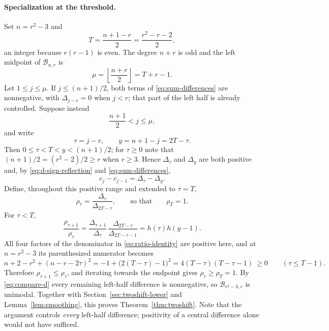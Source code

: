 \documentclass[11pt]{article}
\theoremstyle{research}
\theoremstyle{definition}
\newcommand{\TS}{\mathcal B}
\numberwithin{equation}{section}
\begin{document}
\paragraph{Specialization at the threshold.}
Set $n=r^2-3$ and
\begin{equation}\label{eq:T}
 T=\frac{n+1-r}{2}=\frac{r^2-r-2}{2},
\end{equation}
an integer because $r(r-1)$ is even. The degree $n+r$ is odd and the left
midpoint of $\TS_{n,r}$ is
\begin{equation}\label{eq:mu}
 \mu=\left\lfloor\frac{n+r}{2}\right\rfloor=T+r-1 .
\end{equation}
Let $1\le j\le\mu$. If $j\le(n+1)/2$, both terms of
\eqref{eq:sum-differences} are nonnegative, with $\Delta_{j-r}=0$ when
$j<r$; that part of the left half is already controlled. Suppose instead
\begin{equation}\label{eq:hard-range}
 \frac{n+1}{2}<j\le\mu,
\end{equation}
and write
\[
 \tau=j-r,\qquad y=n+1-j=2T-\tau .
\]
Then $0\le\tau<T<y<(n+1)/2$; for $\tau\ge0$ note that
$(n+1)/2=(r^2-2)/2\ge r$ when $r\ge3$.
Hence $\Delta_\tau$ and $\Delta_y$ are both positive and, by
\eqref{eq:d-sign-reflection} and \eqref{eq:sum-differences},
\begin{equation}\label{eq:compare-d}
 c_j-c_{j-1}=\Delta_\tau-\Delta_y .
\end{equation}
Define, throughout this positive range and extended to $\tau=T$,
\[
 \rho_\tau=\frac{\Delta_\tau}{\Delta_{2T-\tau}},
 \qquad\text{so that}\qquad \rho_T=1 .
\]
For $\tau<T$,
\begin{equation}\label{eq:R-step}
 \frac{\rho_{\tau+1}}{\rho_\tau}
  =\frac{\Delta_{\tau+1}}{\Delta_\tau}\,
     \frac{\Delta_{2T-\tau}}{\Delta_{2T-\tau-1}}
  =h(\tau)h(y-1).
\end{equation}
All four factors of the denominator in \eqref{eq:ratio-identity} are
positive here, and at $n=r^2-3$ its parenthesized numerator becomes
\begin{equation}\label{eq:nonnegative-factor}
 n+2-r^2+(n-r-2\tau)^2
 =-1+\bigl(2(T-\tau)-1\bigr)^2
 =4(T-\tau)(T-\tau-1)\ \ge 0
 \qquad(\tau\le T-1).
\end{equation}
Therefore $\rho_{\tau+1}\le\rho_\tau$, and iterating towards the endpoint
gives $\rho_\tau\ge\rho_T=1$. By \eqref{eq:compare-d} every remaining
left-half difference is nonnegative, so $\TS_{r^2-3,r}$ is unimodal.
Together with Section~\ref{sec:twoshift-lower} and
Lemma~\ref{lem:smoothing}, this proves Theorem~\ref{thm:twoshift}.
Note that the argument controls \emph{every} left-half difference;
positivity of a central difference alone would not have sufficed.
\end{document}
